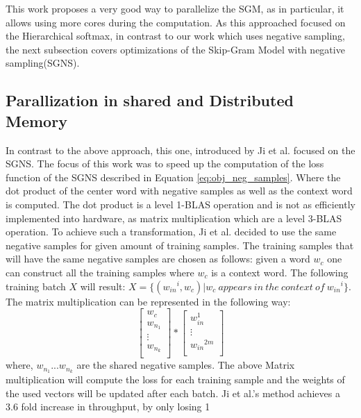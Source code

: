 This work proposes a very good way to parallelize the SGM, as in particular, it allows using more cores during the computation. As this approached focused on the Hierarchical softmax, in contrast to our work which uses negative sampling, the next subsection covers optimizations of the Skip-Gram Model with negative sampling(SGNS).

\subsection{Parallization in shared and Distributed Memory}
In contrast to the above approach, this one, introduced by Ji et al. \citep{intel} focused on the SGNS. The focus of this work was to speed up the computation of the loss function of the SGNS described in Equation \ref{eq:obj_neg_samples}. Where the dot product of the center word  with negative samples as well as the context word is computed. The dot product is a level 1-BLAS operation and is not as efficiently implemented into hardware, as matrix multiplication which are a level 3-BLAS operation.  To achieve such a transformation, Ji et al. decided to use the same negative samples for given amount of training samples. The training samples that will have the same negative samples are chosen as follows: given a word $w_c$ one can construct all the training samples where $w_c$ is a context word. The following training batch $X$ will result: $X = \{({w_{in}}^i, w_c) | w_c~appears~in~the~context~of~{w_{in}}^i\}$. The matrix multiplication can be represented in the following way:
\[
\begin{bmatrix}
w_c \\
w_{n_1} \\
\vdots \\
w_{n_k}\\
\end{bmatrix}
*
\begin{bmatrix}
w_{in}^1\\
\vdots\\
{w_{in}}^{2m}\\
\end{bmatrix}
\]
where, $w_{n_1}...w_{n_k}$ are the shared negative samples. The above Matrix multiplication will compute the loss for each training sample and the weights of the used vectors will be updated after each batch. Ji et al.'s method achieves a 3.6 fold increase in throughput, by only losing 1\ %

